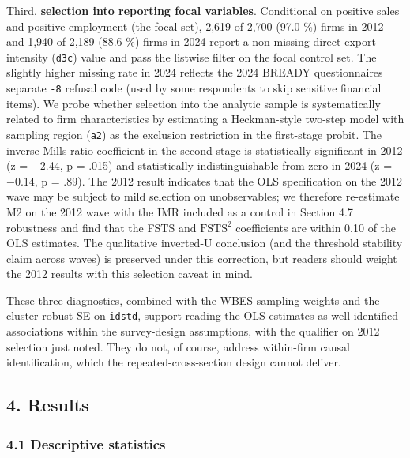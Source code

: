 \documentclass[12pt,a4paper]{article}
\begin{document}
Third, \textbf{selection into reporting focal variables}. Conditional on
positive sales and positive employment (the focal set), 2,619 of 2,700
(97.0 \%) firms in 2012 and 1,940 of 2,189 (88.6 \%) firms in 2024
report a non-missing direct-export-intensity (\texttt{d3c}) value and
pass the listwise filter on the focal control set. The slightly higher
missing rate in 2024 reflects the 2024 BREADY
questionnaire\textquotesingle s separate \texttt{-8} refusal code (used
by some respondents to skip sensitive financial items). We probe whether
selection into the analytic sample is systematically related to firm
characteristics by estimating a Heckman-style two-step model with
sampling region (\texttt{a2}) as the exclusion restriction in the
first-stage probit. The inverse Mills ratio coefficient in the second
stage is statistically significant in 2012 (z = −2.44, p = .015) and
statistically indistinguishable from zero in 2024 (z = −0.14, p = .89).
The 2012 result indicates that the OLS specification on the 2012 wave
may be subject to mild selection on unobservables; we therefore
re-estimate M2 on the 2012 wave with the IMR included as a control in
Section 4.7 robustness and find that the FSTS and \(\mathrm{FSTS}^2\)
coefficients are within 0.10 of the OLS estimates. The qualitative
inverted-U conclusion (and the threshold stability claim across waves)
is preserved under this correction, but readers should weight the 2012
results with this selection caveat in mind.

These three diagnostics, combined with the WBES sampling weights and the
cluster-robust SE on \texttt{idstd}, support reading the OLS estimates
as well-identified associations within the survey-design assumptions,
with the qualifier on 2012 selection just noted. They do not, of course,
address within-firm causal identification, which the
repeated-cross-section design cannot deliver.

\hypertarget{4-results}{%
\subsection{4. Results}\label{4-results}}

\hypertarget{41-descriptive-statistics}{%
\subsubsection{4.1 Descriptive
statistics}\label{41-descriptive-statistics}}
\end{document}
